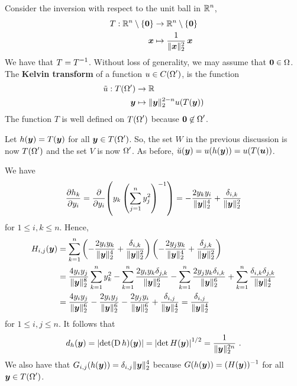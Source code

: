 Consider the inversion with respect to the unit ball in $\DS \RR^n$,
\begin{align*}
T:\RR^n \setminus \{\VEC{0}\} & \rightarrow \RR^n \setminus \{\VEC{0}\} \\
\VEC{x} & \mapsto \frac{1}{\|\VEC{x}\|_2^2} \, \VEC{x}
\end{align*}
We have that $\DS T=T^{-1}$.  Without loss of generality, we
may assume that $\VEC{0} \in \Omega$.  The
{\bfseries Kelvin transform} of a
function $\DS u\in C(\Omega^{\prime})$, is the function
\begin{align*}
\tilde{u}: T(\Omega^{\prime}) & \rightarrow \RR \\
\VEC{y} & \mapsto \|\VEC{y}\|_2^{2-n} u(T(\VEC{y}))
\end{align*}
The function $T$ is well defined on $\DS T(\Omega^{\prime})$ because
$\DS \VEC{0} \not\in \Omega^{\prime}$.

Let $h(\VEC{y}) = T(\VEC{y})$ for all
$\DS \VEC{y} \in T(\Omega^{\prime})$.
So, the set $W$ in the previous discussion is now
$\DS T(\Omega^{\prime})$ and
the set $V$ is now $\DS \Omega^{\prime}$.  As before,
$\breve{u}(\VEC{y}) = u(h(\VEC{y})) = u(T(\VEC{u}))$.

We have
\[
\pdydx{h_k}{y_i} = \pdfdx{\left( y_k \left( \sum_{j=1}^n y_j^2
\right)^{-1} \right)}{y_i}
= -\frac{2 y_k y_i}{\|\VEC{y}\|_2^4} + \frac{\delta_{i,k}}{\|\VEC{y}\|_2^2}
\]
for $1 \leq i, k \leq n$.  Hence,
\begin{align*}
H_{i,j}(\VEC{y}) &= \sum_{k=1}^n \left( -\frac{2 y_i y_k}{\|\VEC{y}\|_2^4} +
  \frac{\delta_{i,k}}{\|\VEC{y}\|_2^2} \right)
\left( -\frac{2 y_j y_k}{\|\VEC{y}\|_2^4} +
  \frac{\delta_{j,k}}{\|\VEC{y}\|_2^2} \right) \\
&= \frac{4 y_iy_j}{\|\VEC{y}\|_2^8} \sum_{k=1}^n y_k^2
- \sum_{k=1}^n \frac{2 y_i y_k \delta_{j,k}}{\|\VEC{y}\|_2^6}
- \sum_{k=1}^n \frac{2 y_j y_k \delta_{i,k}}{\|\VEC{y}\|_2^6}
+ \sum_{k=1}^n \frac{ \delta_{i,k}\delta_{j,k}}{\|\VEC{y}\|_2^4} \\
&= \frac{4 y_iy_j}{\|\VEC{y}\|_2^6}
- \frac{2 y_i y_j}{\|\VEC{y}\|_2^6}
- \frac{2 y_j y_i}{\|\VEC{y}\|_2^6}
+ \frac{ \delta_{i,j}}{\|\VEC{y}\|_2^4}
= \frac{ \delta_{i,j}}{\|\VEC{y}\|_2^4}
\end{align*}
for $1 \leq i,j \leq n$.  It follows that
\[
d_h(\VEC{y}) = \left| \det (\diff h)(\VEC{y}) \right|
= \left| \det H(\VEC{y}) \right|^{1/2}
= \frac{1}{\|\VEC{y}\|_2^{2n}} \ .
\]
We also have that
$\DS G_{i,j}(h(\VEC{y})) = \delta_{i,j} \|\VEC{y}\|_2^4$
because $\DS G(h(\VEC{y})) = (H(\VEC{y}))^{-1}$ for all
$\DS \VEC{y} \in T(\Omega^{\prime})$.


